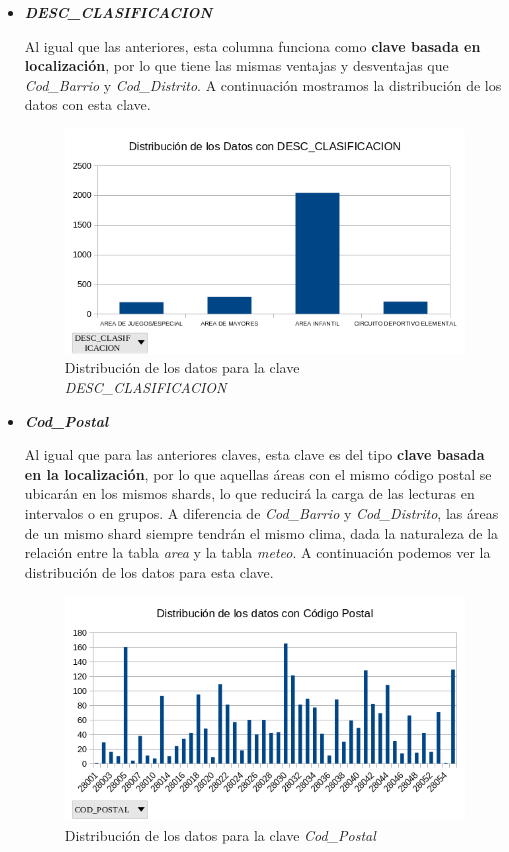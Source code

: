 \documentclass[]{article}
\begin{document}
\begin{itemize}
    \item \textbf{\textit{DESC\_CLASIFICACION}}
    
    Al igual que las anteriores, esta columna funciona como \textbf{clave basada en localización}, por lo que tiene las mismas ventajas y desventajas que \textit{Cod\_Barrio} y \textit{Cod\_Distrito}. A continuación mostramos la distribución de los datos con esta clave.

    \begin{figure}[H]
        \includegraphics[width=0.90\linewidth]{Distribucion_DESC_CLASIFICACION.png}
        \caption{Distribución de los datos para la clave \textit{DESC\_CLASIFICACION}}
    \end{figure}

    \item \textbf{\textit{Cod\_Postal}}
    
    Al igual que para las anteriores claves, esta clave es del tipo \textbf{clave basada en la localización}, por lo que aquellas áreas con el mismo código postal se ubicarán en los mismos shards, lo que reducirá la carga de las lecturas en intervalos o en grupos. A diferencia de \textit{Cod\_Barrio} y \textit{Cod\_Distrito}, las áreas de un mismo shard siempre tendrán el mismo clima, dada la naturaleza de la relación entre la tabla \textit{area} y la tabla \textit{meteo}. A continuación podemos ver la distribución de los datos para esta clave.
    \begin{figure}[H]
        \includegraphics[width=0.90\linewidth]{Distribucion_Cod_Postal.png}
        \caption{Distribución de los datos para la clave \textit{Cod\_Postal}}
    \end{figure}


\end{itemize}
\end{document}
